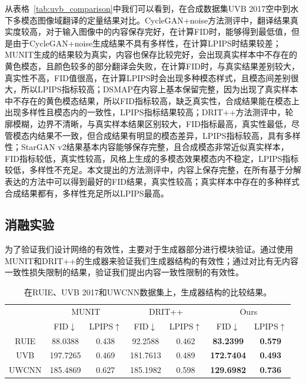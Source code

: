从表格~\ref{tab:uvb_comparison}中我们可以看到，在合成数据集UVB 2017空中到水下多模态图像域翻译的定量结果对比。CycleGAN+noise方法测评中，翻译结果真实度较高，对于输入图像中的内容保存完好，在计算FID时，能够得到最低值，但是由于CycleGAN+noise生成结果不具有多样性，在计算LPIPS时结果较差；MUNIT生成的结果较为真实，内容也保存比较完好，会出现真实样本中不存在的黄色模态，且颜色较多的部分翻译会失败，在计算FID时，与真实结果差别较大，真实性不高，FID值很高，在计算LPIPS时会出现多种模态样式，且模态间差别很大，所以LPIPS指标较高；DSMAP在内容上基本保留完整，因为出现了真实样本中不存在的黄色模态结果，所以FID指标较高，缺乏真实性，合成结果能在模态上出现多样性且模态内的一致性，LPIPS指标结果较高；DRIT++方法测评中，轮廓模糊，边界不清晰，与真实样本结果区别较大，FID指标最高，真实性最低，尽管模态内结果不一致，但合成结果有明显的模态差异，LPIPS指标较高，具有多样性；StarGAN v2结果基本内容能够保存完整，且合成模态非常近似真实样本，FID指标较低，真实性较高，风格上生成的多模态效果模态内不稳定，LPIPS指标较低，多样性不充足。本文提出的方法测评中，内容上保存完整，在所有基于分解表达的方法中可以得到最好的FID结果，真实性较高；真实样本中存在的多种样式合成结果都有，多样性充足所以LPIPS最高。

\subsection{消融实验}

为了验证我们设计网络的有效性，主要对于生成器部分进行模块验证。通过使用MUNIT和DRIT++的生成器来验证我们生成器结构的有效性；通过对比有无内容一致性损失限制的结果，验证我们提出内容一致性限制的有效性。

\begin{table}[htbp]
  \centering
  \caption{在RUIE、UVB 2017和UWCNN数据集上，生成器结构的比较结果。}
    \begin{tabular}{c|c|c|c|c|c|c}
    \hline
    \multirow{2}[3]{*}{} & \multicolumn{2}{c|}{MUNIT} & \multicolumn{2}{c|}{DRIT++} & \multicolumn{2}{c}{Ours} \\
\cmidrule{2-7}          & \multicolumn{1}{c|}{FID$\downarrow$ } & \multicolumn{1}{c|}{LPIPS$\uparrow$} & \multicolumn{1}{c|}{FID$\downarrow$ } & \multicolumn{1}{c|}{LPIPS$\uparrow$} & \multicolumn{1}{c|}{FID$\downarrow$ } & LPIPS$\uparrow$ \\
    \midrule
    RUIE  & 88.0388 & 0.438 & 92.2588 & 0.462 & \textbf{83.2399} & \textbf{0.579} \\
    UVB  & 197.7265 & 0.469 & 181.7613 & 0.489 & \textbf{172.7404} & \textbf{0.493} \\
    UWCNN & 185.4869 & 0.627 & 185.1982 & 0.598 & \textbf{129.6982} & \textbf{0.736} \\
    \hline
    \end{tabular}%
  \label{tab:comp_G}%
\end{table}%

